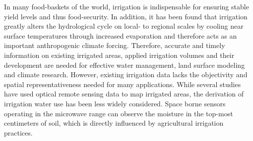 \documentclass[hess, manuscript]{copernicus}
\begin{document}
\newpage
{}%
\label{sec:conclusions}
In many food-baskets of the world, irrigation is indispensable for ensuring stable yield levels and thus food-security. In addition, it has been found that irrigation greatly alters the hydrological cycle on local- to regional scales by cooling near surface temperatures through increased evaporation and therefore acts as an important anthropogenic climate forcing. Therefore, accurate and timely information on existing irrigated areas, applied irrigation volumes and their development are needed for effective water management, land surface modeling and climate research. However, existing irrigation data lacks the objectivity and spatial representativeness needed for many applications. While several studies have used optical remote sensing data to map irrigated areas, the derivation of irrigation water use has been less widely considered. Space borne sensors operating in the microwave range can observe the moisture in the top-most centimeters of soil, which is directly influenced by agricultural irrigation practices.\\ 
\end{document}
